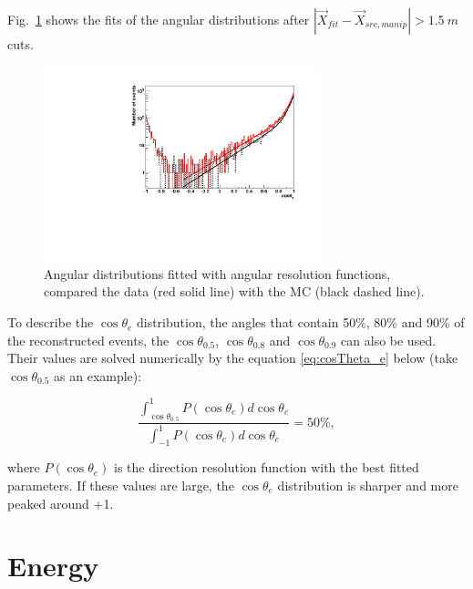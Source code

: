 Fig.~\ref{angularResolMPW} shows the fits of the angular distributions after $|\vec{X}_{fit}-\vec{X}_{src,manip}|>1.5~m$ cuts.
\begin{figure}
	\centering
	\includegraphics[width=8cm]{angularResol_107055_mpw.pdf}
	\caption{Angular distributions fitted with angular resolution functions, compared the data (red solid line) with the MC (black dashed line).}
	\label{angularResolMPW}
\end{figure}

To describe the $\cos\theta_e$ distribution, the angles that contain 50\%, 80\%
and 90\% of the reconstructed events, the $\cos\theta_{0.5}$, $\cos\theta_{0.8}$ and $\cos\theta_{0.9}$ can also be used. Their values are solved numerically by the equation \ref{eq:cosTheta_e} below (take $\cos\theta_{0.5}$ as an example):

\begin{equation}\label{eq:cosTheta_e}
\frac{\int_{\cos\theta_{0.5}}^1 P(\cos\theta_e) d\cos\theta_e}{\int_{-1}^1 P(\cos\theta_e) d\cos\theta_e} = 50\%,
\end{equation}

where $P(\cos\theta_e)$ is the direction resolution function with the best fitted parameters. If these values are large, the $\cos\theta_e$ distribution is sharper and more peaked around +1.




\section{Energy}

